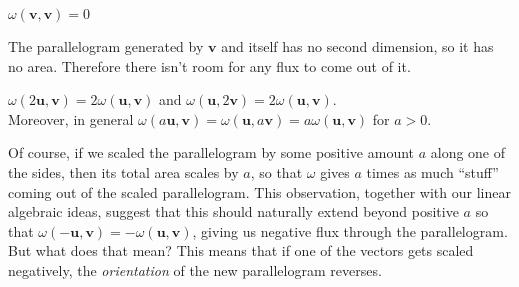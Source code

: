 \documentclass[../master.tex]{subfiles}
\begin{document}
	\begin{obs}
		$\omega(\mathbf v, \mathbf v) = 0$
	\end{obs}
	The parallelogram generated by $\mathbf v$ and itself has no second dimension, so it has no area. Therefore there isn't room for any flux to come out of it.
	\begin{obs}
		$\omega(2\mathbf u, \mathbf v) = 2 \omega(\mathbf u, \mathbf v)$ and $\omega(\mathbf u,2 \mathbf v) = 2 \omega(\mathbf u, \mathbf v)$.\\
		Moreover, in general $\omega(a \mathbf u, \mathbf v) = \omega(\mathbf u,a \mathbf v)= a \omega(\mathbf u, \mathbf v)$ for $a>0$.
	\end{obs}
	Of course, if we scaled the parallelogram by some positive amount $a$ along one of the sides, then its total area scales by $a$, so that $\omega$ gives $a$ times as much ``stuff'' coming out of the scaled parallelogram. This observation, together with our linear algebraic ideas, suggest that this should naturally extend beyond positive $a$ so that $\omega(-\mathbf u,\mathbf v) = -\omega(\mathbf u, \mathbf v)$, giving us negative flux through the parallelogram. But what does that mean? This means that if one of the vectors gets scaled negatively, the \emph{orientation} of the new parallelogram reverses. 
	
\end{document}
